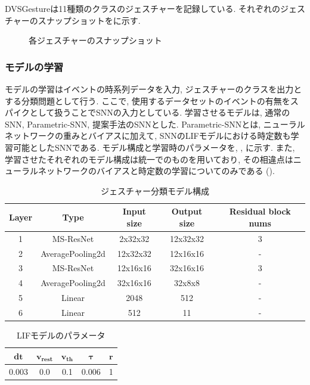 DVSGestureは11種類のクラスのジェスチャーを記録している.
それぞれのジェスチャーのスナップショットをに示す.
\begin{figure}[htb]
    \centering
    
    \caption{各ジェスチャーのスナップショット}
    \label{fig:dvs:gesture}
\end{figure}


\subsubsection{モデルの学習}
モデルの学習はイベントの時系列データを入力, ジェスチャーのクラスを出力とする分類問題として行う.
ここで, 使用するデータセットのイベントの有無をスパイクとして扱うことでSNNの入力としている.
学習させるモデルは, 通常のSNN, Parametric-SNN, 提案手法のSNNとした.
Parametric-SNNとは, ニューラルネットワークの重みとバイアスに加えて, SNNのLIFモデルにおける時定数も学習可能としたSNNである.
モデル構成と学習時のパラメータを, , に示す.
また, 学習させたそれぞれのモデル構成は統一でのものを用いており, その相違点はニューラルネットワークのバイアスと時定数の学習についてのみである ().
\begin{table}[htb]
    \centering
    \caption{ジェスチャー分類モデル構成}
    \label{tab:exp2:model}
    \begin{tabular}{ccccc}
        \hline
        \textbf{Layer}& \textbf{Type}&\textbf{Input size} & \textbf{Output size} & \textbf{Residual block nums}\\
        \hline
        1   & MS-ResNet & 2x32x32 & 12x32x32 & 3\\
        2 & AveragePooling2d & 12x32x32 & 12x16x16 & - \\
        3 & MS-ResNet & 12x16x16 & 32x16x16 & 3\\
        4 & AveragePooling2d & 32x16x16 & 32x8x8 & - \\
        5 & Linear & 2048 & 512 & - \\
        6 & Linear & 512 & 11 & - \\
        \hline
    \end{tabular}
\end{table}

\begin{table}[htb]
    \centering
    \caption{LIFモデルのパラメータ}
    \label{tab:exp2:model:parameter:lif}
    \begin{tabular}{ccccc}
        \hline
        $\bm{dt}$& $\bm{v_{rest}}$ & $\bm{v_{th}}$ & $\bm{\tau}$ & $\bm{r}$\\
        \hline
        0.003   & 0.0 & 0.1 & 0.006 & 1 \\
        \hline
    \end{tabular}
\end{table}


